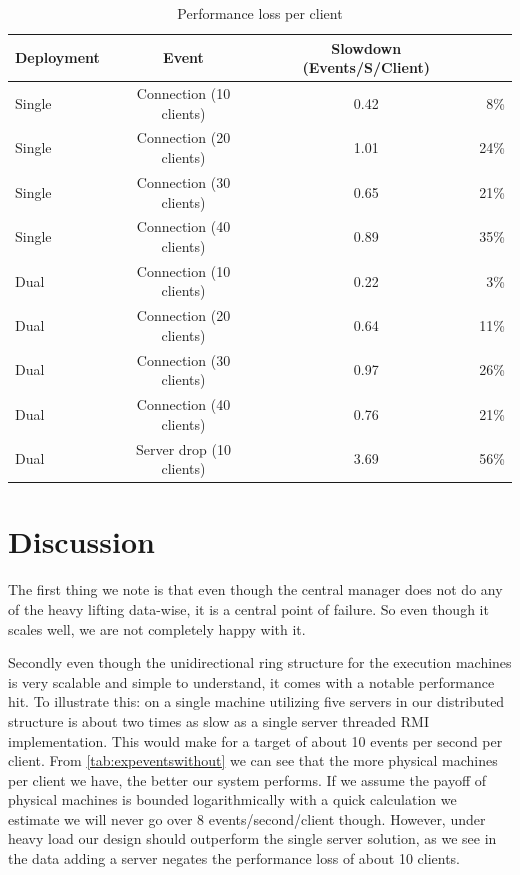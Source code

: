 \documentclass[a4paper,10pt]{article}
\begin{document}
\begin{table}
\centering
\begin{tabular}{| l | c | c r |}
\hline
\textbf{Deployment} & \textbf{Event} & \textbf{Slowdown (Events/S/Client)} & \\
\hline
\hline
Single & Connection (10 clients) & 0.42  & 8\%\\
\hline
Single & Connection (20 clients) & 1.01  & 24\%\\
\hline
Single & Connection (30 clients) & 0.65  & 21\%\\
\hline
Single & Connection (40 clients) & 0.89  & 35\%\\
\hline
Dual & Connection (10 clients) & 0.22  & 3\%\\
\hline
Dual & Connection (20 clients) & 0.64  & 11\%\\
\hline
Dual & Connection (30 clients) & 0.97  & 26\%\\
\hline
Dual & Connection (40 clients) & 0.76  & 21\%\\
\hline
Dual & Server drop (10 clients) & 3.69  & 56\%\\
\hline
\end{tabular}
\caption{Performance loss per client}
\label{tab:expaggregateloss}
\end{table}

\section{Discussion}
\label{sec:discussion}
The first thing we note is that even though the central manager does not do any of the heavy lifting data-wise, it is a central point of failure.
So even though it scales well, we are not completely happy with it.

Secondly even though the unidirectional ring structure for the execution machines is very scalable and simple to understand,
it comes with a notable performance hit.
To illustrate this: on a single machine utilizing five servers in our distributed structure is about two times as slow as a single server threaded RMI implementation.
This would make for a target of about 10 events per second per client.
From \autoref{tab:expeventswithout} we can see that the more physical machines per client we have, the better our system performs.
If we assume the payoff of physical machines is bounded logarithmically with a quick calculation we estimate we will never go over 8 events/second/client though.
However, under heavy load our design should outperform the single server solution, as we see in the data adding a server negates the performance
loss of about 10 clients.
\end{document}
